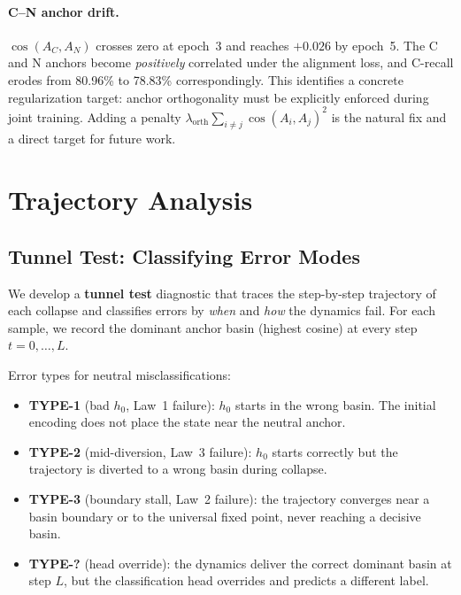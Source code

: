 \documentclass[11pt]{article}
\newcommand{\anchor}[1]{A_{#1}}
\begin{document}
\paragraph{C--N anchor drift.}
$\cos(\anchor{C}, \anchor{N})$ crosses zero at epoch~3 and reaches
$+0.026$ by epoch~5. The C and N anchors become \emph{positively}
correlated under the alignment loss, and C-recall erodes from 80.96\%
to 78.83\% correspondingly. This identifies a concrete regularization
target: anchor orthogonality must be explicitly enforced during joint
training. Adding a penalty $\lambda_{\text{orth}}\sum_{i \neq j}\cos(\anchor{i},\anchor{j})^2$
is the natural fix and a direct target for future work.

\section{Trajectory Analysis}
\label{sec:analysis}

\subsection{Tunnel Test: Classifying Error Modes}
\label{sec:tunnel}

We develop a \textbf{tunnel test} diagnostic that traces the step-by-step
trajectory of each collapse and classifies errors by \emph{when} and
\emph{how} the dynamics fail. For each sample, we record the dominant
anchor basin (highest cosine) at every step $t = 0, \ldots, L$.

Error types for neutral misclassifications:
\begin{itemize}
    \item \textbf{TYPE-1} (bad $h_0$, Law~1 failure): $h_0$ starts in the wrong basin. The initial encoding does not place the state near the neutral anchor.
    \item \textbf{TYPE-2} (mid-diversion, Law~3 failure): $h_0$ starts correctly but the trajectory is diverted to a wrong basin during collapse.
    \item \textbf{TYPE-3} (boundary stall, Law~2 failure): the trajectory converges near a basin boundary or to the universal fixed point, never reaching a decisive basin.
    \item \textbf{TYPE-?} (head override): the dynamics deliver the correct dominant basin at step $L$, but the classification head overrides and predicts a different label.
\end{itemize}
\end{document}
